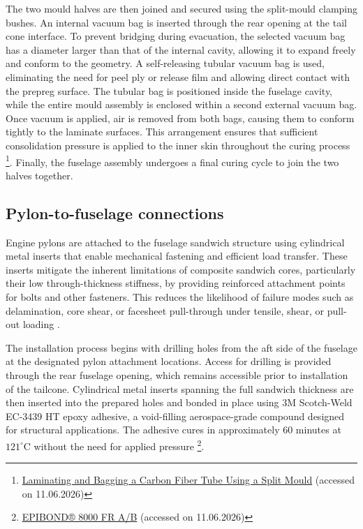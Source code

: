 The two mould halves are then joined and secured using the split-mould clamping bushes. An internal vacuum bag is inserted through the rear opening at the tail cone interface. To prevent bridging during evacuation, the selected vacuum bag has a diameter larger than that of the internal cavity, allowing it to expand freely and conform to the geometry. A self-releasing tubular vacuum bag is used, eliminating the need for peel ply or release film and allowing direct contact with the prepreg surface. The tubular bag is positioned inside the fuselage cavity, while the entire mould assembly is enclosed within a second external vacuum bag. Once vacuum is applied, air is removed from both bags, causing them to conform tightly to the laminate surfaces. This arrangement ensures that sufficient consolidation pressure is applied to the inner skin throughout the curing process \footnote{\href{https://www.easycomposites.eu/learning/split-mould-carbon-fibre-tube}{Laminating and Bagging a Carbon Fiber Tube Using a Split Mould} (accessed on 11.06.2026)}. Finally, the fuselage assembly undergoes a final curing cycle to join the two halves together.

\subsection{Pylon-to-fuselage connections}
\label{sub:pylon_to_fuselage}

Engine pylons are attached to the fuselage sandwich structure using cylindrical metal inserts that enable mechanical fastening and efficient load transfer. These inserts mitigate the inherent limitations of composite sandwich cores, particularly their low through-thickness stiffness, by providing reinforced attachment points for bolts and other fasteners. This reduces the likelihood of failure modes such as delamination, core shear, or facesheet pull-through under tensile, shear, or pull-out loading \cite{Severson2024}.

The installation process begins with drilling holes from the aft side of the fuselage at the designated pylon attachment locations. Access for drilling is provided through the rear fuselage opening, which remains accessible prior to installation of the tailcone. Cylindrical metal inserts spanning the full sandwich thickness are then inserted into the prepared holes and bonded in place using 3M Scotch-Weld EC-3439 HT epoxy adhesive, a void-filling aerospace-grade compound designed for structural applications. The adhesive cures in approximately 60 minutes at $121^{\circ}$C without the need for applied pressure \footnote{\href{https://products.huntsman.com/products/epibond-8000-fr-a-b-qeuj1kf4}{EPIBOND® 8000 FR A/B} (accessed on 11.06.2026)}.

